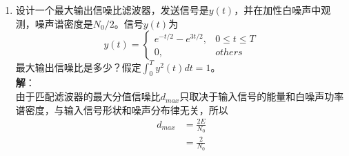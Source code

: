 \documentclass{article}
\begin{document}
\begin{enumerate}[1.]
\begin{enumerate}[(1)]
\end{enumerate}

\item
设计一个最大输出信噪比滤波器，发送信号是$y(t)$，并在加性白噪声中观测，噪声谱密度是$N_{0}/2$。信号$y(t)$为
$$y(t)=
	\begin{cases}
	e^{-t/2}-e^{3t/2},& 0\le t \le T\\
	0,& others
	\end{cases} 
$$
最大输出信噪比是多少？假定$\int_{0}^{T}y^{2}(t)dt=1$。\\
\textbf{解}：\\
由于匹配滤波器的最大分值信噪比$d_{max}$只取决于输入信号的能量和白噪声功率谱密度，与输入信号形状和噪声分布律无关，所以\\
\begin{equation*}
\begin{split}
d_{max} &= \frac{2E} {N_{0}}\\
&=\frac{2} {N_{0}}
\end{split}
\end{equation*}
\end{enumerate}
\end{document}
